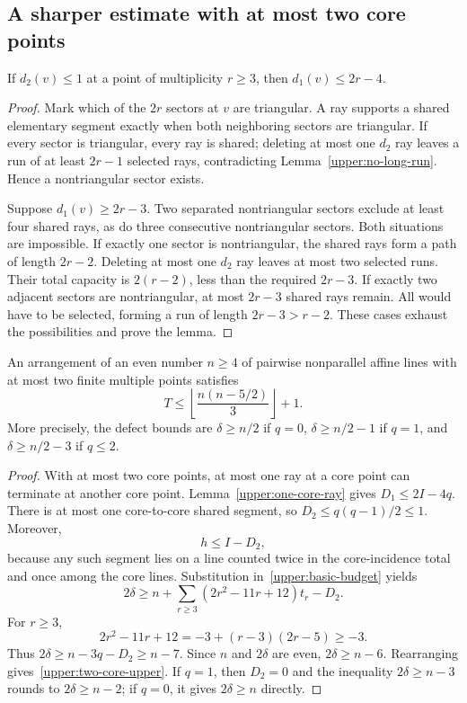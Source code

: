\subsection{A sharper estimate with at most two core points}

\begin{lemma}
\label{upper:one-core-ray}
If $d_2(v)\le1$ at a point of multiplicity $r\ge3$, then $d_1(v)\le2r-4$.
\end{lemma}

\begin{proof}
Mark which of the $2r$ sectors at $v$ are triangular. A ray supports a shared elementary segment exactly when both neighboring sectors are triangular. If every sector is triangular, every ray is shared; deleting at most one $d_2$ ray leaves a run of at least $2r-1$ selected rays, contradicting Lemma~\ref{upper:no-long-run}. Hence a nontriangular sector exists.

Suppose $d_1(v)\ge2r-3$. Two separated nontriangular sectors exclude at least four shared rays, as do three consecutive nontriangular sectors. Both situations are impossible. If exactly one sector is nontriangular, the shared rays form a path of length $2r-2$. Deleting at most one $d_2$ ray leaves at most two selected runs. Their total capacity is $2(r-2)$, less than the required $2r-3$. If exactly two adjacent sectors are nontriangular, at most $2r-3$ shared rays remain. All would have to be selected, forming a run of length $2r-3>r-2$. These cases exhaust the possibilities and prove the lemma.
\end{proof}

\begin{theorem}
\label{upper:two-core}
An arrangement of an even number $n\ge4$ of pairwise nonparallel affine lines with at most two finite multiple points satisfies
\begin{equation}
 T\le\left\lfloor\frac{n(n-5/2)}3\right\rfloor+1.
 \label{upper:two-core-upper}
\end{equation}
More precisely, the defect bounds are $\delta\ge n/2$ if $q=0$, $\delta\ge n/2-1$ if $q=1$, and $\delta\ge n/2-3$ if $q\le2$.
\end{theorem}

\begin{proof}
With at most two core points, at most one ray at a core point can terminate at another core point. Lemma~\ref{upper:one-core-ray} gives $D_1\le2I-4q$. There is at most one core-to-core shared segment, so $D_2\le q(q-1)/2\le1$. Moreover,
\[
 h\le I-D_2,
\]
because any such segment lies on a line counted twice in the core-incidence total and once among the core lines. Substitution in~\eqref{upper:basic-budget} yields
\[
 2\delta\ge n+\sum_{r\ge3}(2r^2-11r+12)t_r-D_2.
\]
For $r\ge3$,
\[
 2r^2-11r+12=-3+(r-3)(2r-5)\ge-3.
\]
Thus $2\delta\ge n-3q-D_2\ge n-7$. Since $n$ and $2\delta$ are even, $2\delta\ge n-6$. Rearranging gives~\eqref{upper:two-core-upper}. If $q=1$, then $D_2=0$ and the inequality $2\delta\ge n-3$ rounds to $2\delta\ge n-2$; if $q=0$, it gives $2\delta\ge n$ directly.
\end{proof}

